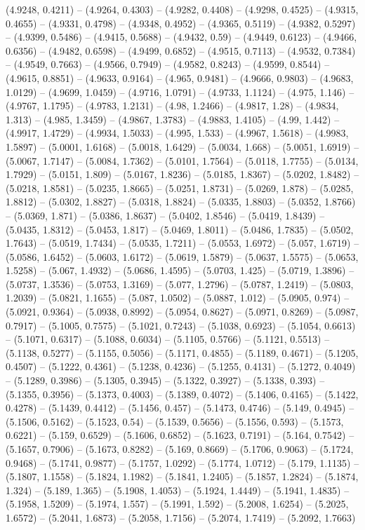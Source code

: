 (4.9248, 0.4211) -- (4.9264, 0.4303) -- (4.9282, 0.4408) -- (4.9298, 0.4525) -- (4.9315, 0.4655) -- (4.9331, 0.4798) -- (4.9348, 0.4952) -- (4.9365, 0.5119) -- (4.9382, 0.5297) -- (4.9399, 0.5486) -- (4.9415, 0.5688) -- (4.9432, 0.59) -- (4.9449, 0.6123) -- (4.9466, 0.6356) -- (4.9482, 0.6598) -- (4.9499, 0.6852) -- (4.9515, 0.7113) -- (4.9532, 0.7384) -- (4.9549, 0.7663) -- (4.9566, 0.7949) -- (4.9582, 0.8243) -- (4.9599, 0.8544) -- (4.9615, 0.8851) -- (4.9633, 0.9164) -- (4.965, 0.9481) -- (4.9666, 0.9803) -- (4.9683, 1.0129) -- (4.9699, 1.0459) -- (4.9716, 1.0791) -- (4.9733, 1.1124) -- (4.975, 1.146) -- (4.9767, 1.1795) -- (4.9783, 1.2131) -- (4.98, 1.2466) -- (4.9817, 1.28) -- (4.9834, 1.313) -- (4.985, 1.3459) -- (4.9867, 1.3783) -- (4.9883, 1.4105) -- (4.99, 1.442) -- (4.9917, 1.4729) -- (4.9934, 1.5033) -- (4.995, 1.533) -- (4.9967, 1.5618) -- (4.9983, 1.5897) -- (5.0001, 1.6168) -- (5.0018, 1.6429) -- (5.0034, 1.668) -- (5.0051, 1.6919) -- (5.0067, 1.7147) -- (5.0084, 1.7362) -- (5.0101, 1.7564) -- (5.0118, 1.7755) -- (5.0134, 1.7929) -- (5.0151, 1.809) -- (5.0167, 1.8236) -- (5.0185, 1.8367) -- (5.0202, 1.8482) -- (5.0218, 1.8581) -- (5.0235, 1.8665) -- (5.0251, 1.8731) -- (5.0269, 1.878) -- (5.0285, 1.8812) -- (5.0302, 1.8827) -- (5.0318, 1.8824) -- (5.0335, 1.8803) -- (5.0352, 1.8766) -- (5.0369, 1.871) -- (5.0386, 1.8637) -- (5.0402, 1.8546) -- (5.0419, 1.8439) -- (5.0435, 1.8312) -- (5.0453, 1.817) -- (5.0469, 1.8011) -- (5.0486, 1.7835) -- (5.0502, 1.7643) -- (5.0519, 1.7434) -- (5.0535, 1.7211) -- (5.0553, 1.6972) -- (5.057, 1.6719) -- (5.0586, 1.6452) -- (5.0603, 1.6172) -- (5.0619, 1.5879) -- (5.0637, 1.5575) -- (5.0653, 1.5258) -- (5.067, 1.4932) -- (5.0686, 1.4595) -- (5.0703, 1.425) -- (5.0719, 1.3896) -- (5.0737, 1.3536) -- (5.0753, 1.3169) -- (5.077, 1.2796) -- (5.0787, 1.2419) -- (5.0803, 1.2039) -- (5.0821, 1.1655) -- (5.087, 1.0502) -- (5.0887, 1.012) -- (5.0905, 0.974) -- (5.0921, 0.9364) -- (5.0938, 0.8992) -- (5.0954, 0.8627) -- (5.0971, 0.8269) -- (5.0987, 0.7917) -- (5.1005, 0.7575) -- (5.1021, 0.7243) -- (5.1038, 0.6923) -- (5.1054, 0.6613) -- (5.1071, 0.6317) -- (5.1088, 0.6034) -- (5.1105, 0.5766) -- (5.1121, 0.5513) -- (5.1138, 0.5277) -- (5.1155, 0.5056) -- (5.1171, 0.4855) -- (5.1189, 0.4671) -- (5.1205, 0.4507) -- (5.1222, 0.4361) -- (5.1238, 0.4236) -- (5.1255, 0.4131) -- (5.1272, 0.4049) -- (5.1289, 0.3986) -- (5.1305, 0.3945) -- (5.1322, 0.3927) -- (5.1338, 0.393) -- (5.1355, 0.3956) -- (5.1373, 0.4003) -- (5.1389, 0.4072) -- (5.1406, 0.4165) -- (5.1422, 0.4278) -- (5.1439, 0.4412) -- (5.1456, 0.457) -- (5.1473, 0.4746) -- (5.149, 0.4945) -- (5.1506, 0.5162) -- (5.1523, 0.54) -- (5.1539, 0.5656) -- (5.1556, 0.593) -- (5.1573, 0.6221) -- (5.159, 0.6529) -- (5.1606, 0.6852) -- (5.1623, 0.7191) -- (5.164, 0.7542) -- (5.1657, 0.7906) -- (5.1673, 0.8282) -- (5.169, 0.8669) -- (5.1706, 0.9063) -- (5.1724, 0.9468) -- (5.1741, 0.9877) -- (5.1757, 1.0292) -- (5.1774, 1.0712) -- (5.179, 1.1135) -- (5.1807, 1.1558) -- (5.1824, 1.1982) -- (5.1841, 1.2405) -- (5.1857, 1.2824) -- (5.1874, 1.324) -- (5.189, 1.365) -- (5.1908, 1.4053) -- (5.1924, 1.4449) -- (5.1941, 1.4835) -- (5.1958, 1.5209) -- (5.1974, 1.557) -- (5.1991, 1.592) -- (5.2008, 1.6254) -- (5.2025, 1.6572) -- (5.2041, 1.6873) -- (5.2058, 1.7156) -- (5.2074, 1.7419) -- (5.2092, 1.7663) 